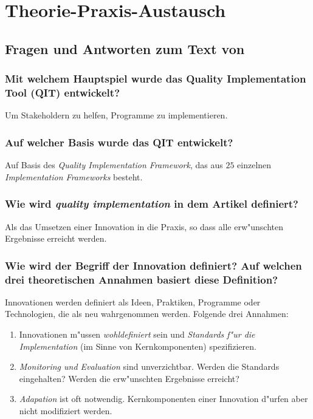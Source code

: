 \section{Theorie-Praxis-Austausch}
\subsection{Fragen und Antworten zum Text von \textcite{meyers_practical_2012}}
\subsubsection{Mit welchem Hauptspiel wurde das Quality Implementation Tool (QIT) entwickelt?}
Um Stakeholdern zu helfen, Programme zu implementieren.

\subsubsection{Auf welcher Basis wurde das QIT entwickelt?}
Auf Basis des \emph{Quality Implementation Framework}, das aus $25$ einzelnen \emph{Implementation Frameworks} besteht.

\subsubsection{Wie wird \emph{quality implementation} in dem Artikel definiert?}
Als das Umsetzen einer Innovation in die Praxis, so dass alle erw"unschten Ergebnisse erreicht werden.

\subsubsection{Wie wird der Begriff der Innovation definiert? Auf welchen drei theoretischen Annahmen basiert diese Definition?}
Innovationen werden definiert als Ideen, Praktiken, Programme oder Technologien, die als neu wahrgenommen werden. Folgende drei Annahmen:
\begin{enumerate}
        \item Innovationen m"ussen \emph{wohldefiniert} sein und \emph{Standards f"ur die Implementation} (im Sinne von Kernkomponenten) spezifizieren.
        \item \emph{Monitoring und Evaluation} sind unverzichtbar. Werden die Standards eingehalten? Werden die erw"unschten Ergebnisse erreicht?
        \item \emph{Adapation} ist oft notwendig. Kernkomponenten einer Innovation d"urfen aber nicht modifiziert werden.
\end{enumerate}

